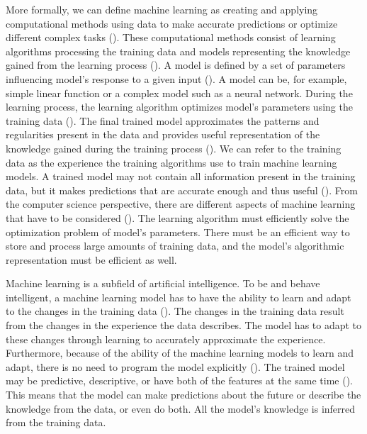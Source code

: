\documentclass{BachelorBUI}
\begin{document}
        More formally, we can define machine learning as creating and applying computational methods using data to make accurate predictions or optimize different complex tasks (\cite{Mohri:2018}). These computational methods consist of learning algorithms processing the training data and models representing the knowledge gained from the learning process (\cite{Alpaydin:2014}). A model is defined by a set of parameters influencing model's response to a given input (\cite{Alpaydin:2014}). A model can be, for example, simple linear function or a complex model such as a neural network. During the learning process, the learning algorithm optimizes model's parameters using the training data (\cite{Alpaydin:2014}). The final trained model approximates the patterns and regularities present in the data and provides useful representation of the knowledge gained during the training process (\cite{Alpaydin:2014}). We can refer to the training data as the experience the training algorithms use to train machine learning models. A trained model may not contain all information present in the training data, but it makes predictions that are accurate enough and thus useful (\cite{Alpaydin:2014}). From the computer science perspective, there are different aspects of machine learning that have to be considered (\cite{Alpaydin:2014}). The learning algorithm must efficiently solve the optimization problem of model's parameters. There must be an efficient way to store and process large amounts of training data, and the model's algorithmic representation must be efficient as well.
        
        Machine learning is a subfield of artificial intelligence. To be and behave intelligent, a machine learning model has to have the ability to learn and adapt to the changes in the training data (\cite{Alpaydin:2014}). The changes in the training data result from the changes in the experience the data describes. The model has to adapt to these changes through learning to accurately approximate the experience. Furthermore, because of the ability of the machine learning models to learn and adapt, there is no need to program the model explicitly (\cite{Alpaydin:2014}). The trained model may be predictive, descriptive, or have both of the features at the same time (\cite{Alpaydin:2014}). This means that the model can make predictions about the future or describe the knowledge from the data, or even do both. All the model's knowledge is inferred from the training data.
\end{document}
